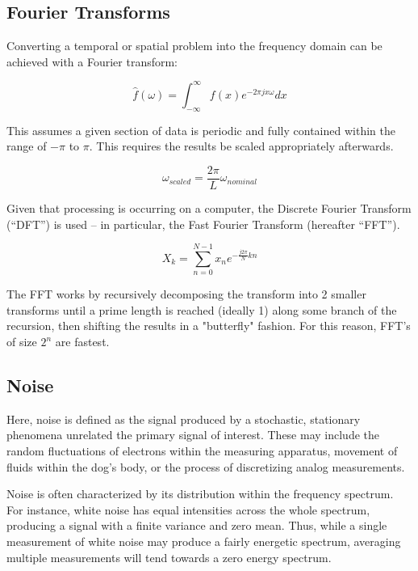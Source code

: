 \documentclass[journal]{IEEEtran}
\begin{document}
\subsection{Fourier Transforms}
Converting a temporal or spatial problem into the frequency domain can be achieved with a Fourier transform:

\begin{equation}
\hat{f}(\omega)=\int_{-\infty}^{\infty}f(x)e^{-2 \pi jx \omega}dx
\end{equation}

This assumes a given section of data is periodic and fully contained within the range of $-\pi$ to $\pi$. This requires the results be scaled appropriately afterwards.

\begin{equation}
\omega_{scaled}=\frac{2\pi}{L}\omega_{nominal}
\end{equation}

Given that processing is occurring on a computer, the Discrete Fourier Transform (``DFT'') is used -- in particular, the Fast Fourier Transform (hereafter ``FFT'').

\begin{equation}
X_{k}=\sum_{n=0}^{N-1}x_{n}e^{-\frac{j2\pi}{N}kn}
\end{equation}

The FFT works by recursively decomposing the transform into 2 smaller transforms until a prime length is reached (ideally 1) along some branch of the recursion, then shifting the results in a "butterfly" fashion. For this reason, FFT's of size $2^n$ are fastest.

\subsection{Noise}
Here, noise is defined as the signal produced by a stochastic, stationary phenomena unrelated the primary signal of interest. These may include the random fluctuations of electrons within the measuring apparatus, movement of fluids within the dog's body, or the process of discretizing analog measurements.

Noise is often characterized by its distribution within the frequency spectrum. For instance, white noise has equal intensities across the whole spectrum, producing a signal with a finite variance and zero mean. Thus, while a single measurement of white noise may produce a fairly energetic spectrum, averaging multiple measurements will tend towards a zero energy spectrum.
\end{document}
